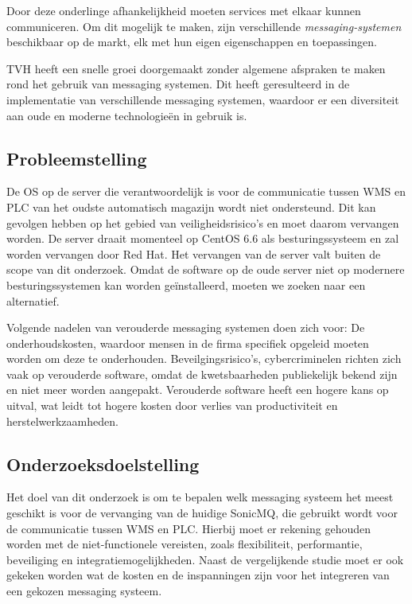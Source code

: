Door deze onderlinge afhankelijkheid moeten services met elkaar kunnen communiceren. 
Om dit mogelijk te maken, zijn verschillende \emph{messaging-systemen} beschikbaar op de markt, 
elk met hun eigen eigenschappen en toepassingen.
\newline 

TVH heeft een snelle groei doorgemaakt zonder algemene afspraken te maken rond het gebruik van messaging systemen. 
Dit heeft geresulteerd in de implementatie van verschillende messaging systemen, waardoor er een diversiteit aan oude en moderne technologieën in gebruik is. 
\newline 
\newline
\newline

\subsection{Probleemstelling}
De OS op de server die verantwoordelijk is voor de communicatie tussen WMS en PLC van het oudste automatisch magazijn wordt niet ondersteund.
Dit kan gevolgen hebben op het gebied van veiligheidsrisico's en moet daarom vervangen worden.
De server draait momenteel op CentOS 6.6 als besturingssysteem en zal worden vervangen door Red Hat.
Het vervangen van de server valt buiten de scope van dit onderzoek. 
Omdat de software op de oude server niet op modernere besturingssystemen kan worden geïnstalleerd, 
moeten we zoeken naar een alternatief.
\newline

Volgende nadelen van verouderde messaging systemen doen zich voor: 
De onderhoudskosten, waardoor mensen in de firma specifiek opgeleid moeten worden om deze te onderhouden. 
Beveilgingsrisico's, cybercriminelen richten zich vaak op verouderde software, omdat de kwetsbaarheden publiekelijk bekend zijn en niet meer worden aangepakt.
Verouderde software heeft een hogere kans op uitval, wat leidt tot hogere kosten door verlies van productiviteit en herstelwerkzaamheden.
\newline 

\subsection{Onderzoeksdoelstelling}
Het doel van dit onderzoek is om te bepalen welk messaging systeem het meest geschikt is voor de vervanging van de huidige SonicMQ,
die gebruikt wordt voor de communicatie tussen WMS en PLC. 
Hierbij moet er rekening gehouden worden met de niet-functionele vereisten,
zoals flexibiliteit, performantie, beveiliging en integratiemogelijkheden.
Naast de vergelijkende studie moet er ook gekeken worden wat de kosten en de inspanningen zijn 
voor het integreren van een gekozen messaging systeem. 
\newline 

